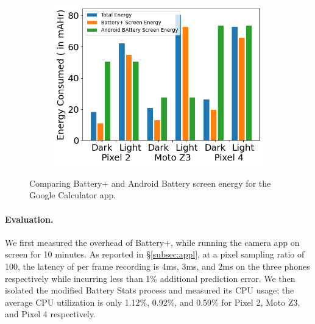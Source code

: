 \begin{figure}[tp]
\begin{minipage}{0.35\columnwidth}
        \vspace{-0.2in}
	\label{fig:tool2_screenshot}
\end{minipage}
\hfill
\begin{minipage}{0.60\columnwidth}
	\begin{subfigure}[]{\textwidth}
		\includegraphics[width=\textwidth]{figure/battery+_screen_energy_compare.png}
	\end{subfigure}
        \vspace{-0.1in}
	\caption{Comparing Battery+ and Android Battery screen energy for the Google Calculator app.}
	\label{fig:tool2_battery_compare}
        \vspace{-0.2in}
\end{minipage}
\end{figure}

\paragraph{Evaluation.}
We first measured the overhead of Battery+, while running the camera app on
screen for 10 minutes.  As reported in \S\ref{subsec:appl}, at a pixel
sampling ratio of 100, the latency of per frame recording is
4ms, 3ms, and 2ms on the three phones respectively while incurring less than
1\% 
additional prediction error.  We then isolated the modified Battery Stats
process and measured its CPU usage; the average CPU utilization is
only 1.12\%, 0.92\%, and 0.59\% for Pixel 2, Moto Z3, and Pixel 4 respectively.

